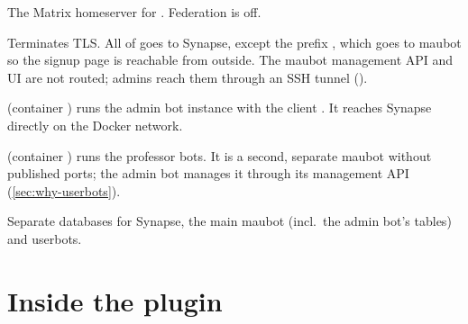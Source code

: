 \begin{description}[style=nextline,leftmargin=1.5em,font=\normalfont\bfseries]
  \item[Synapse] The Matrix homeserver for \server. Federation is off.
  \item[host nginx] Terminates TLS. All of  goes to Synapse, except the prefix
    , which goes to maubot so the signup page is
    reachable from outside. The maubot management API and UI are not routed; admins reach
    them through an SSH tunnel ().
  \item[maubot \enquote{main}] (container ) runs the admin bot instance
    with the client . It reaches Synapse directly on the Docker network.
  \item[maubot \enquote{userbots}] (container ) runs the professor bots.
    It is a second, separate maubot without published ports; the admin bot manages it
    through its management API (\autoref{sec:why-userbots}).
  \item[PostgreSQL] Separate databases for Synapse, the main maubot (incl.\ the admin bot's
    tables) and userbots.
\end{description}

\section{Inside the plugin}

